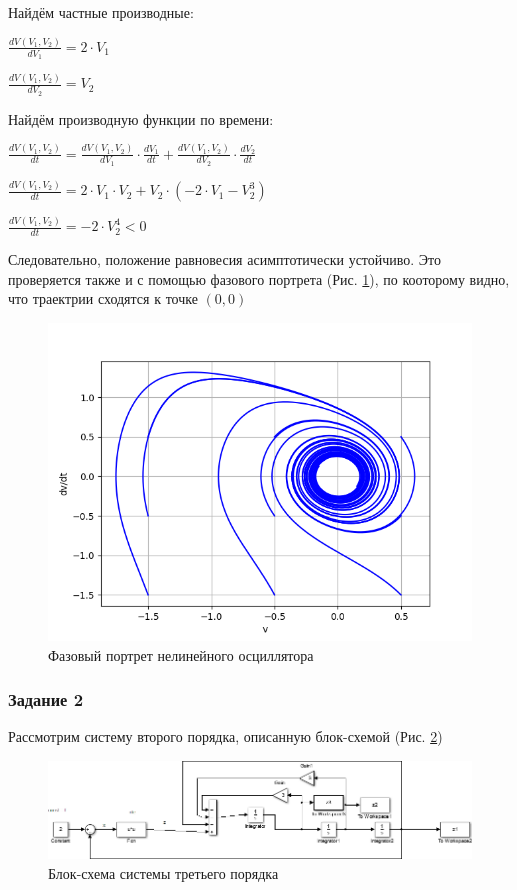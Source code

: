 Найдём частные производные:

$\frac{dV(V_1,V_2)}{dV_1}=2 \cdot V_1$

$\frac{dV(V_1,V_2)}{dV_2}=V_2$

Найдём производную функции по времени:

$
\frac{dV(V_1,V_2)}{dt}=\frac{dV(V_1,V_2)}{dV_1} \cdot \frac{dV_1}{dt} + \frac{dV(V_1,V_2)}{dV_2} \cdot \frac{dV_2}{dt}
$

$
\frac{dV(V_1,V_2)}{dt}=2 \cdot V_1 \cdot V_2 + V_2 \cdot (-2 \cdot V_1 - V_2 ^3)
$

$
\frac{dV(V_1,V_2)}{dt}=-2 \cdot V_2 ^ 4 < 0
$

Следовательно, положение равновесия асимптотически устойчиво. Это проверяется также и с помощью фазового
портрета (Рис. \ref{fig:5}), по кооторому видно, что траектрии сходятся к точке $(0,0)$

\begin{figure}[H]
	\centering
	\includegraphics[width=0.7\linewidth]{body/images/non-linear-oscillator-system-phase-portrait.png}
	\caption{Фазовый портрет нелинейного осциллятора}
	\label{fig:5}
\end{figure}

\subsubsection{Задание 2}

Рассмотрим систему второго порядка, описанную блок-схемой (Рис. \ref{fig:6})

\begin{figure}[H]
	\centering
	\includegraphics[width=0.8\linewidth]{body/images/non-linear-system.png}
	\caption{Блок-схема системы третьего порядка}
	\label{fig:6}
\end{figure}

